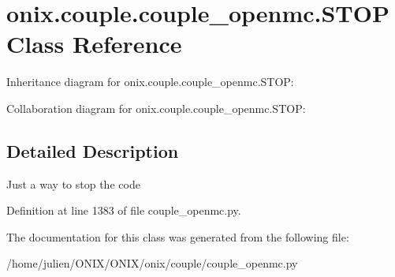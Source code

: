 \hypertarget{classonix_1_1couple_1_1couple__openmc_1_1STOP}{}\section{onix.\+couple.\+couple\+\_\+openmc.\+S\+T\+OP Class Reference}
\label{classonix_1_1couple_1_1couple__openmc_1_1STOP}


Inheritance diagram for onix.\+couple.\+couple\+\_\+openmc.\+S\+T\+OP\+:


Collaboration diagram for onix.\+couple.\+couple\+\_\+openmc.\+S\+T\+OP\+:


\subsection{Detailed Description}
\begin{DoxyVerb}Just a way to stop the code\end{DoxyVerb}
 

Definition at line 1383 of file couple\+\_\+openmc.\+py.



The documentation for this class was generated from the following file\+:\begin{DoxyCompactItemize}
\item 
/home/julien/\+O\+N\+I\+X/\+O\+N\+I\+X/onix/couple/couple\+\_\+openmc.\+py\end{DoxyCompactItemize}
